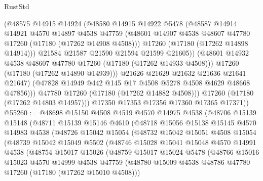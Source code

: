 \begin{lexlean}{RustStd}
\begin{coremodule}
{\begin{coremodule}
{{{{{{{{{{{{{{{{{{{{{{{{{{{{{{{{{{{{{{{{{{{{{{{{{{{{{{{                    (@48575
                      @14915
                      @14924
                      (@48580
                        @14915
                        @14922
                        @5478
                        (@48587
                          @14914
                          @14921
                          @4570
                          @14897
                          @4538
                          @47759
                          (@48601 @14907 @4538 @48607 @47780 @17260 (@17180 (@17262 @14908 @4508)))
                          @17260
                          (@17180 (@17262 @14898 @14914)))
                        @21584
                        @21587
                        @21590
                        @21594
                        @21599
                        @21605))
                    (@48601 @14932 @4538 @48607 @47780 @17260 (@17180 (@17262 @14933 @4508)))
                    @17260
                    (@17180 (@17262 @14890 @14939)))
                  @21626
                  @21629
                  @21632
                  @21636
                  @21641
                  @21647)
                (@47828 @14949 @442 @145 @17 @4508 @5278 @4508 @4629 @48668 @47856)))
            @47780
            @17260
            (@17180 (@17262 @14882 @4508)))
          @17260
          (@17180 (@17262 @14803 @14957)))
        @17350
        @17353
        @17356
        @17360
        @17365
        @17371))
@55260 := @48698
    @15150
    @4508
    @4519
    @4570
    @14975
    @4538
    (@48706
      @15139
      @15148
      (@48711
        @15139
        @15146
        @4610
        (@48718
          @15056
          @15138
          @15145
          @4570
          @14983
          @4538
          (@48726
            @15042
            @15054
            (@48732
              @15042
              @15051
              @4508
              @15054
              (@48739
                @15042
                @15049
                @5502
                (@48746
                  @15028
                  @15041
                  @15048
                  @4570
                  @14991
                  @4538
                  (@48754
                    @15017
                    @15026
                    (@48759
                      @15017
                      @15024
                      @5478
                      (@48766
                        @15016
                        @15023
                        @4570
                        @14999
                        @4538
                        @47759
                        (@48780 @15009 @4538 @48786 @47780 @17260 (@17180 (@17262 @15010 @4508)))
}}}}}}}}}}}}}}}}}}}}}}}}}}}}}}}}}}}}}}}}}}}}}}}}}}}}}}}
\end{coremodule}}
\end{coremodule}
\end{lexlean}
